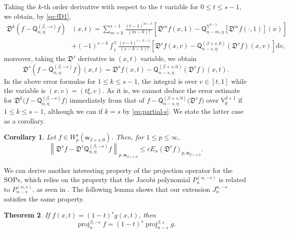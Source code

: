 \documentclass{amsart}
\newtheorem{thm}{Theorem}[section]
\newtheorem{cor}[thm]{Corollary}
\theoremstyle{remark}
\def\d{\mathrm{d}}
\def\sph{{\mathbb{S}^{d-1}}}
\def\sw{{\mathsf w}}
\def\sQ{{\mathsf Q}}
\def\fD{{\mathfrak D}}
\def\a{{\alpha}}
\def\b{{\beta}}
\def\VV{{\mathbb V}}
\def\proj{\operatorname{proj}}
\begin{document}
Taking the $k$-th order derivative with respect to the $t$ variable for $ 0 \le t \le s-1$, we obtain, by \eqref{eq:fD1},
\begin{align*}
 \fD^k \left(f  - \sQ_{n,\eta}^{(\beta, -s)}f \right)&(x,t)  = \sum_{m= k}^{s-1} \frac{(t-1)^{m-k}}{(m-k)!}
      \left [  \fD^m f(x,1)
     - \sQ_{n-m,\eta}^{\sph} [ \fD^m f(\cdot,1)](x) \right] \\
   & +  (-1)^{s-k} \int_{t}^{1} \frac{(v-t)^{s-k-1}}{(s-k-1)!} \left[  \fD^s f (x, v)-
      \sQ_{n-s,\eta}^{(\b+s,0)}\left( \fD^s f\right) (x, v) \right] \d v,
\end{align*}
moreover, taking the $\fD^s$ derivative in $(x,t)$ variable, we obtain
\begin{equation} \label{eq:partial-s}
     \fD^s \left(f  - \sQ_{n,\eta}^{(\beta, -s)}f \right)(x,t) =  \fD^s f(x,t)-\sQ_{n-s,\eta}^{(\b+s,0)}\left( \fD^s f\right) (x, t).
\end{equation}
In the above error formulas for $1\le k \le s-1$, the integral is over $v \in [t,1]$ while the variable is
$(x,v) = (t \xi, v)$. As it is, we cannot deduce the error estimate for $\fD^k \big(f  - \sQ_{n,\eta}^{(\beta, -s)}f \big)$ 
immediately from that of $f -  \sQ_{n-s,\eta}^{(\b+s,0)}\big(\fD^s f\big)$ over $\VV_0^{d+1}$ if $1 \le k \le s-1$,
although we can if $k =s$ by \eqref{eq:partial-s}. We state the latter case as a corollary.

\begin{cor}
Let $f \in W_p^s(\sw_{\b+s,0})$. Then, for $1 \le p \le \infty$,
$$
   \left \|\fD^s f - \fD^s \sQ_{n,\eta}^{(\beta, -s)}f \right\|_{p, \sw_{\b+s,0}}
    \le c E_n\left( \fD^s f \right)_{p, \sw_{\b+s,0}}.
$$
\end{cor}

We can derive another interesting property of the projection operator for the SOPs, which relies on
the property that the Jacobi polynomial $P_n^{(\a,-s)}$ is related to $P_{n-s}^{(\a,s)}$, as seen in
\cite[(4.22.2)]{Sz}. The following lemma shows that our extension $J_n^{\a,-s}$ satisfies the same
property.

\begin{thm}
If $f(x,t) = (1-t)^s g(x,t)$, then
$$
   \proj_n^{\b,-s} f = (1-t)^s \proj_{n-s}^{\b,s} g.
$$
\end{thm}
\end{document}
